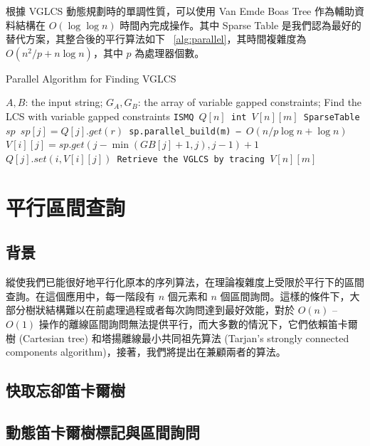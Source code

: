 \documentclass{gapd}
\begin{document}
根據 VGLCS 動態規劃時的單調性質，可以使用 Van Emde Boas Tree 作為輔助資料結構在 $O(\log \log n)$ 時間內完成操作。其中 Sparse Table 是我們認為最好的替代方案，其整合後的平行算法如下 ~\ref{alg:parallel}，其時間複雜度為 $O(n^2 / p + n \log n)$，其中 $p$ 為處理器個數。

\begin{algorithm*}
  \caption{Parallel Algorithm for Finding VGLCS}
  \label{alg:parallel}
  \begin{algorithmic}[1]
    \Require
      $A, B$: the input string;
      $G_A, G_B$: the array of variable gapped constraints;
    \Ensure Find the LCS with variable gapped constraints
    \State \tt{ISMQ} $Q[n]$
    \State \tt{int} $V[n][m]$
      \State SparseTable $sp$
        \State $sp[j] = Q[j].get(r)$
      \EndParFor
      \State sp.parallel\_build(m) -- $O(n/p \log n + \log n)$
            \State $V[i][j] = sp.get(j - \min(GB[j]+1, j), j-1)+1$
            \State $Q[j].set(i, V[i][j])$
        \EndIf
      \EndParFor
    \EndFor
    \State Retrieve the VGLCS by tracing $V[n][m]$
  \end{algorithmic}
\end{algorithm*}

\section{平行區間查詢} %
\label{sec:parallelRMQ}

\subsection{背景}

縱使我們已能很好地平行化原本的序列算法，在理論複雜度上受限於平行下的區間查詢。在這個應用中，每一階段有 $n$ 個元素和 $n$ 個區間詢問。這樣的條件下，大部分樹狀結構難以在前處理過程或者每次詢問達到最好效能，對於 $O(n)$ -- $O(1)$ 操作的離線區間詢問無法提供平行，而大多數的情況下，它們依賴笛卡爾樹 (Cartesian tree) 和塔揚離線最小共同祖先算法 (Tarjan's strongly connected components algorithm)，接著，我們將提出在兼顧兩者的算法。

\subsection{快取忘卻笛卡爾樹}

\subsection{動態笛卡爾樹標記與區間詢問}
\end{document}
